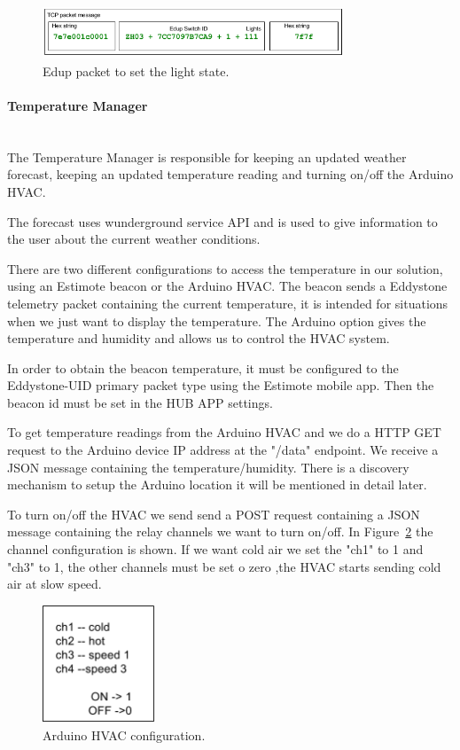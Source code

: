 \begin{figure}[h]
\centering
\includegraphics[width=0.8\textwidth]{Figures/Edup_imp}
\caption{Edup packet to set the light state.}
\label{edup_imp}
\end{figure}


\paragraph{Temperature Manager}\mbox{}\\


The Temperature Manager is responsible for keeping an updated weather forecast, keeping an updated temperature reading and turning on/off the Arduino \ac{HVAC}.

The forecast uses wunderground service API and is used to give information to the user about the current weather conditions.

There are two different configurations to access the temperature in our solution, using an Estimote beacon or the Arduino \ac{HVAC}. 
The beacon sends a Eddystone telemetry packet containing the current temperature, it is intended for situations when we just want to display the temperature.
The Arduino option gives the temperature and humidity and allows us to control the \ac{HVAC} system.


In order to obtain the beacon temperature, it must be configured to the Eddystone-UID primary packet type using the Estimote mobile app. Then the beacon id must be set in the HUB APP settings.

To get temperature readings from the Arduino \ac{HVAC} and we do a \ac{HTTP}  GET request to the Arduino device IP address at the "/data" endpoint. We receive a \ac{JSON} message containing the temperature/humidity. There is a discovery mechanism to setup the Arduino location it will be mentioned in detail later.

To turn on/off the \ac{HVAC} we send send a POST request containing a \ac{JSON} message containing the relay channels we want to turn on/off. In Figure~\ref{arduino_post_imp} the channel configuration is shown. If we want cold air we set the "ch1" to 1 and "ch3" to 1, the other channels must be set o zero ,the \ac{HVAC} starts sending cold air at slow speed.


\begin{figure}[h]
\centering
\includegraphics[width=0.3\textwidth]{Figures/temperature_post_imp}
\caption{Arduino HVAC configuration.}
\label{arduino_post_imp}
\end{figure}


